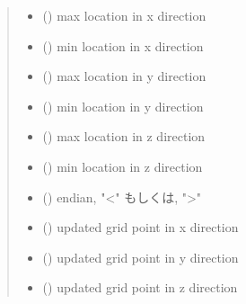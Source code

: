 \documentclass[letterpaper,10pt,dvipdfmx,report]{sphinxmanual}
\begin{document}
\begin{fulllineitems}
\begin{quote}
\begin{description}
\begin{itemize}
\item {} 
\sphinxAtStartPar
{} () \sphinxhyphen{}\sphinxhyphen{} max location in x direction

\item {} 
\sphinxAtStartPar
{} () \sphinxhyphen{}\sphinxhyphen{} min location in x direction

\item {} 
\sphinxAtStartPar
{} () \sphinxhyphen{}\sphinxhyphen{} max location in y direction

\item {} 
\sphinxAtStartPar
{} () \sphinxhyphen{}\sphinxhyphen{} min location in y direction

\item {} 
\sphinxAtStartPar
{} () \sphinxhyphen{}\sphinxhyphen{} max location in z direction

\item {} 
\sphinxAtStartPar
{} () \sphinxhyphen{}\sphinxhyphen{} min location in z direction

\item {} 
\sphinxAtStartPar
{} () \sphinxhyphen{}\sphinxhyphen{} endian, "\textless{}" もしくは, "\textgreater{}"

\item {} 
\sphinxAtStartPar
{} () \sphinxhyphen{}\sphinxhyphen{} updated grid point in x direction

\item {} 
\sphinxAtStartPar
{} () \sphinxhyphen{}\sphinxhyphen{} updated grid point in y direction

\item {} 
\sphinxAtStartPar
{} () \sphinxhyphen{}\sphinxhyphen{} updated grid point in z direction


\end{itemize}
\end{description}
\end{quote}
\end{fulllineitems}
\end{document}
